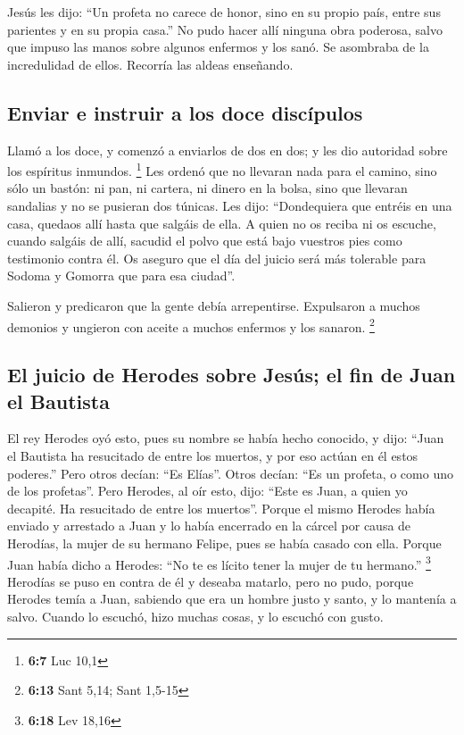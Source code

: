 Jesús les dijo: ``Un profeta no carece de honor, sino en
su propio país, entre sus parientes y en su propia casa.''
 No pudo hacer allí ninguna obra poderosa, salvo que
impuso las manos sobre algunos enfermos y los sanó.  Se
asombraba de la incredulidad de ellos. Recorría las aldeas enseñando.

\hypertarget{enviar-e-instruir-a-los-doce-discuxedpulos}{%
\subsection{Enviar e instruir a los doce
discípulos}\label{enviar-e-instruir-a-los-doce-discuxedpulos}}

 Llamó a los doce, y comenzó a enviarlos de dos en dos; y
les dio autoridad sobre los espíritus inmundos. \footnote{\textbf{6:7}
  Luc 10,1}  Les ordenó que no llevaran nada para el
camino, sino sólo un bastón: ni pan, ni cartera, ni dinero en la bolsa,
 sino que llevaran sandalias y no se pusieran dos túnicas.
 Les dijo: ``Dondequiera que entréis en una casa, quedaos
allí hasta que salgáis de ella.  A quien no os reciba ni
os escuche, cuando salgáis de allí, sacudid el polvo que está bajo
vuestros pies como testimonio contra él. Os aseguro que el día del
juicio será más tolerable para Sodoma y Gomorra que para esa ciudad''.

 Salieron y predicaron que la gente debía arrepentirse.
 Expulsaron a muchos demonios y ungieron con aceite a
muchos enfermos y los sanaron. \footnote{\textbf{6:13} Sant 5,14; Sant
  1,5-15}

\hypertarget{el-juicio-de-herodes-sobre-jesuxfas-el-fin-de-juan-el-bautista}{%
\subsection{El juicio de Herodes sobre Jesús; el fin de Juan el
Bautista}\label{el-juicio-de-herodes-sobre-jesuxfas-el-fin-de-juan-el-bautista}}

 El rey Herodes oyó esto, pues su nombre se había hecho
conocido, y dijo: ``Juan el Bautista ha resucitado de entre los muertos,
y por eso actúan en él estos poderes.''  Pero otros
decían: ``Es Elías''. Otros decían: ``Es un profeta, o como uno de los
profetas''.  Pero Herodes, al oír esto, dijo: ``Este es
Juan, a quien yo decapité. Ha resucitado de entre los muertos''.
 Porque el mismo Herodes había enviado y arrestado a Juan
y lo había encerrado en la cárcel por causa de Herodías, la mujer de su
hermano Felipe, pues se había casado con ella.  Porque
Juan había dicho a Herodes: ``No te es lícito tener la mujer de tu
hermano.'' \footnote{\textbf{6:18} Lev 18,16}  Herodías
se puso en contra de él y deseaba matarlo, pero no pudo, 
porque Herodes temía a Juan, sabiendo que era un hombre justo y santo, y
lo mantenía a salvo. Cuando lo escuchó, hizo muchas cosas, y lo escuchó
con gusto.

